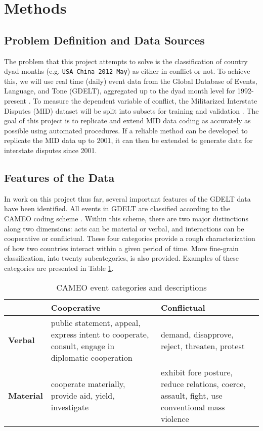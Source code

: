 \documentclass[12pt,letterpaper]{article} %
\begin{document}
\section{Methods}

\subsection{Problem Definition and Data Sources}

The problem that this project attempts to solve is the classification of country dyad months (e.g. \texttt{USA-China-2012-May}) as either in conflict or not. To achieve this, we will use real time (daily) event data from the Global Database of Events, Language, and Tone (GDELT), aggregated up to the dyad month level for 1992-present \citep{schrodt2013gdelt}. To measure the dependent variable of conflict, the Militarized Interstate Disputes (MID) dataset will be split into subsets for training and validation \citep{ghosn2004mid3}. The goal of this project is to replicate and extend MID data coding as accurately as possible using automated procedures. If a reliable method can be developed to replicate the MID data up to 2001, it can then be extended to generate data for interstate disputes since 2001. 


\subsection{Features of the Data}

In work on this project thus far, several important features of the GDELT data have been identified. All events in GDELT are classified according to the CAMEO coding scheme \citep{gerner:etal:2002}. Within this scheme, there are two major distinctions along two dimensions: acts can be material or verbal, and interactions can be cooperative or conflictual. These four categories provide a rough characterization of how two countries interact within a given period of time. More fine-grain classification, into twenty subcategories, is also provided. Examples of these categories are presented in Table \ref{cameo}.

\begin{table}[t]
\caption{CAMEO event categories and descriptions}
\label{cameo}
\begin{center}
\begin{tabular}{lp{2in}p{2in}}
& \textbf{Cooperative} & \textbf{Conflictual} \\
\midrule
\textbf{Verbal} & public statement, appeal, express intent to cooperate, consult, engage in diplomatic cooperation & demand, disapprove, reject, threaten, protest \\
\textbf{Material} & cooperate materially, provide aid, yield, investigate & exhibit fore posture, reduce relations, coerce, assault, fight, use conventional mass violence
\end{tabular}
\end{center}
\end{table}
\end{document}
